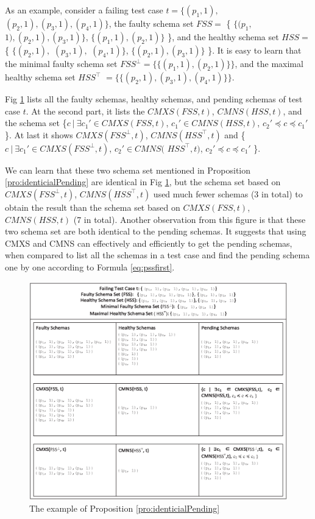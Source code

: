{As an example, consider a failing test case $t = \{(p_{1}, 1),$ $ (p_{2}, 1), (p_{3}, 1), (p_{4}, 1)\}$, the faulty schema set $FSS =$ \{ $\{(p_{1}, $ $1), (p_{2}, 1), (p_{3}, 1)\}$, $\{(p_{1}, 1), (p_{2}, 1)\}$ \}, and the healthy schema set $HSS =$  \{ $\{(p_{2}, 1),$ $(p_{3}, 1),$ $(p_{4}, 1)\}$, $\{(p_{2}, 1), (p_{3}, 1)\}$ \}. It is easy to learn that the minimal faulty schema set $FSS^{\bot} = \{\{(p_{1}, 1), (p_{2}, 1)\}\}$, and the maximal healthy schema set $HSS^{\top}$ $= \{\{ (p_{2}, 1), (p_{3}, 1), (p_{4}, 1) \}\}$.

Fig \ref{fig_minmax} lists all the faulty schemas, healthy schemas, and pending schemas of test case $t$. At the second part, it lists the $CMXS(FSS, t)$, $CMNS(HSS, t)$, and the schema set \{$ c\ |\ \exists c_{1}' \in CMXS(FSS, t)$, $c_{1}' \in CMNS(HSS, t)$, $c_{2}' \preceq c \preceq c_{1}'$ \}. At last it shows $CMXS(FSS^{\bot}, t)$, $CMNS(HSS^{\top}, t)$ and  \{$ c\ |\ \exists c_{1}' \in CMXS(FSS^{\bot}, t)$, $ c_{2}' \in CMNS($ $HSS^{\top}, t)$, $c_{2}' \preceq c \preceq c_{1}'$ \}.

We can learn that these two schema set mentioned in Proposition \ref{pro:identicialPending} are identical in Fig \ref{fig_minmax}, but the schema set based on $CMXS(FSS^{\bot}, t)$, $CMNS(HSS^{\top}, t)$ used much fewer schemas (3 in total) to obtain the result than the schema set based on $CMXS(FSS, t)$, $CMNS(HSS, t)$ (7 in total). Another observation from this figure is that these two schema set are both identical to the pending schemas. It suggests that using CMXS and CMNS can effectively and efficiently to get the pending schemas, when compared to list all the schemas in a test case and find the pending schema one by one according to Formula \ref{eq:pssfirst}.

\begin{figure}[ht]
 \centering
 \includegraphics[width=5.6in]{minmax.eps}
 \caption{The example of Proposition \ref{pro:identicialPending}}
 \label{fig_minmax}
\end{figure}


}
